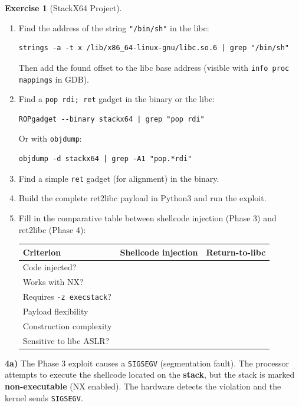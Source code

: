 \documentclass[a4paper,11pt]{article}
\theoremstyle{plain}
\theoremstyle{definition}
\newtheorem{exercice}{Exercise}
\begin{document}
\begin{exercice}[StackX64 Project]
\begin{enumerate}
\item[\textbf{4c)}] Find the address of the string \texttt{"/bin/sh"} in the libc:
\begin{lstlisting}[style=GDBStyle]
strings -a -t x /lib/x86_64-linux-gnu/libc.so.6 | grep "/bin/sh"
\end{lstlisting}
Then add the found offset to the libc base address (visible with \texttt{info proc mappings} in GDB).

\item[\textbf{4d)}] Find a \texttt{pop rdi; ret} gadget in the binary or the libc:
\begin{lstlisting}[style=GDBStyle]
ROPgadget --binary stackx64 | grep "pop rdi"
\end{lstlisting}
Or with \texttt{objdump}:
\begin{lstlisting}[style=GDBStyle]
objdump -d stackx64 | grep -A1 "pop.*rdi"
\end{lstlisting}

\item[\textbf{4e)}] Find a simple \texttt{ret} gadget (for alignment) in the binary.

\item[\textbf{4f)}] Build the complete ret2libc payload in Python3 and run the exploit.

\item[\textbf{4g)}] Fill in the comparative table between shellcode injection (Phase 3) and ret2libc (Phase 4):
\begin{center}
\begin{tabular}{lcc}
\toprule
\textbf{Criterion} & \textbf{Shellcode injection} & \textbf{Return-to-libc} \\
\midrule
Code injected? & & \\
Works with NX? & & \\
Requires \texttt{-z execstack}? & & \\
Payload flexibility & & \\
Construction complexity & & \\
Sensitive to libc ASLR? & & \\
\bottomrule
\end{tabular}
\end{center}
\end{enumerate}

\begin{correction}

\textbf{4a)} The Phase 3 exploit causes a \texttt{SIGSEGV} (segmentation fault). The processor attempts to execute the shellcode located on the \textbf{stack}, but the stack is marked \textbf{non-executable} (NX enabled). The hardware detects the violation and the kernel sends \texttt{SIGSEGV}.


\end{correction}
\end{exercice}
\end{document}

